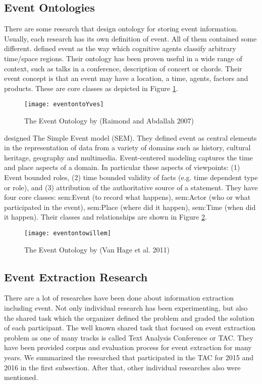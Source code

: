 \subsection{Event Ontologies}
\label{eventontologies}
There are some research that design ontology for storing event information. Usually, each research has its own definition of event. All of them contained some different. \cite{raimond2007event} defined event as the way which cognitive agents classify arbitrary time/space regions. Their ontology has been proven useful in a wide range of context, such as talks in a conference, description of concert or chords. Their event concept is that an event may have a location, a time, agents, factors and products. These are core classes as depicted in Figure \ref{fig:eventontoYves}. \\
\begin{figure}
    \centering
    \texttt{[image: eventontoYves]}
    \caption{The Event Ontology by (Raimond and Abdallah 2007)}
    \label{fig:eventontoYves}
\end{figure}
\indent \cite{van2011design} designed The Simple Event model (SEM). They defined event as central elements in the representation of data from a variety of domains such as history, cultural heritage, geography and multimedia. Event-centered modeling captures the time and place aspects of a domain. In particular these aspects of viewpoints: (1) Event bounded roles, (2) time bounded validity of facts (e.g. time dependent type or role), and (3) attribution of the authoritative source of a statement. They have four core classes: sem:Event (to record what happens), sem:Actor (who or what participated in the event), sem:Place (where did it happen), sem:Time (when did it happen). Their classes and relationships are shown in Figure \ref{fig:eventontowillem}.\\
\begin{figure}
    \centering
    \texttt{[image: eventontowillem]}
    \caption{The Event Ontology by (Van Hage et al. 2011)}
    \label{fig:eventontowillem}
\end{figure}
\subsection{Event Extraction Research}
\label{eventextractionresearch}
There are a lot of researches have been done about information extraction including event. Not only individual research has been experimenting, but also the shared task which the organizer defined the problem and graded the solution of each participant. The well known shared task that focused on event extraction problem as one of many tracks is called Text Analysis Conference or TAC. They have been provided corpus and evaluation process for event extraction for many years. We summarized the researched that participated in the TAC for 2015 and 2016 in the first subsection. After that, other individual researches also were mentioned.
